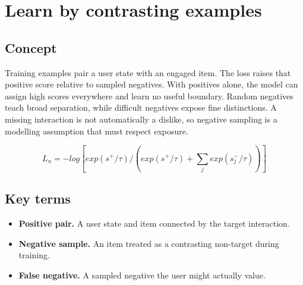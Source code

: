 \section{Learn by contrasting examples}

\begin{abstract}
Positive events say what should be close; negatives give the space its shape.
\end{abstract}

\subsection{Concept}
Training examples pair a user state with an engaged item. The loss raises that positive score relative to sampled negatives. With positives alone, the model can assign high scores everywhere and learn no useful boundary. Random negatives teach broad separation, while difficult negatives expose fine distinctions. A missing interaction is not automatically a dislike, so negative sampling is a modelling assumption that must respect exposure.

\begin{equation*}
L_u = -log [ exp(s^{+}/τ) / (exp(s^{+}/τ) + \sum_j exp(s^{-}_j/τ)) ]
\end{equation*}

\subsection{Key terms}
\begin{itemize}
\item \textbf{Positive pair.} A user state and item connected by the target interaction.
\item \textbf{Negative sample.} An item treated as a contrasting non-target during training.
\item \textbf{False negative.} A sampled negative the user might actually value.
\end{itemize}
